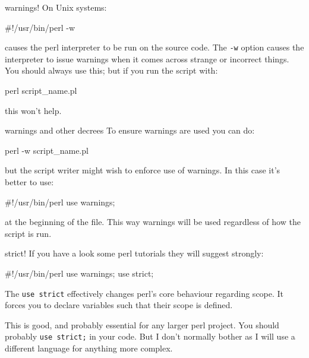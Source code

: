 \documentclass[pdf]{beamer}
\begin{document}
\begin{frame}[fragile]{warnings!}
  On Unix systems:
  
  \begin{perlcode}
    #!/usr/bin/perl -w
  \end{perlcode}

  causes the perl interpreter to be run on the source code. The \texttt{-w}
  option causes the interpreter to issue warnings when it comes across strange
  or incorrect things. You should always use this; but if you run the script
  with:

  \begin{consolecode}
    perl script_name.pl
  \end{consolecode}
 
  this won't help.

\end{frame}

\begin{frame}[fragile]{warnings and other decrees}
  To ensure warnings are used you can do:
  
  \begin{consolecode}
    perl -w script_name.pl
  \end{consolecode}

  but the script writer might wish to enforce use of warnings. In this case
  it's better to use:
  
  \begin{perlcode}
    #!/usr/bin/perl
    use warnings;
  \end{perlcode}
  
  at the beginning of the file. This way warnings will be used regardless of
  how the script is run.
\end{frame}

\begin{frame}[fragile]{strict!}
  If you have a look some perl tutorials they will suggest strongly:

  \begin{perlcode}
    #!/usr/bin/perl
    use warnings;
    use strict;
  \end{perlcode}
  
  The \texttt{use strict} effectively changes perl's core behaviour regarding
  scope. It forces you to declare variables such that their scope is defined.

  This is good, and probably essential for any larger perl project. You should
  probably \texttt{use strict;} in your code. But I don't normally bother as I
  will use a different language for anything more complex.
\end{frame}
\end{document}
